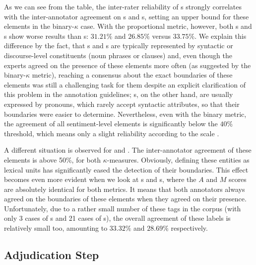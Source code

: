 As we can see from the table, the inter-rater reliability of
s strongly correlates with the inter-annotator
agreement on s and s, setting an
upper bound for these elements in the binary-$\kappa$ case.  With the
proportional metric, however, both s and
s show worse results than s:
$31.21\%$ and $26.85\%$ versus $33.75\%$.  We explain this difference
by the fact, that s and s are
typically represented by syntactic or discourse-level constituents
(noun phrases or clauses) and, even though the experts agreed on the
presence of these elements more often (as suggested by the
binary-$\kappa$ metric), reaching a consensus about the exact
boundaries of these elements was still a challenging task for them
despite an explicit clarification of this problem in the annotation
guidelines; s, on the other hand, are usually
expressed by pronouns, which rarely accept syntactic attributes, so
that their boundaries were easier to determine.  Nevertheless, even
with the binary metric, the agreement of all sentiment-level elements
is significantly below the $40\%$ threshold, which means only a slight
reliability according to the \citeauthor{Landis:77} scale
\cite{Landis:77}.

A different situation is observed for  and
.  The inter-annotator agreement of these
elements is above 50\%, for both $\kappa$-measures.  Obviously,
defining these entities as lexical units has significantly eased the
detection of their boundaries.  This effect becomes even more evident
when we look at s and s, where
the $A$ and $M$ scores are absolutely identical for both metrics.  It
means that both annotators always agreed on the boundaries of these
elements when they agreed on their presence.  Unfortunately, due to a
rather small number of these tags in the corpus (with only 3 cases of
s and 21 cases of s), the
overall agreement of these labels is relatively small too, amounting
to $33.32\%$ and $28.69\%$ respectively.

\subsection{Adjudication Step}\label{subsec:eval-adjudication-step}

